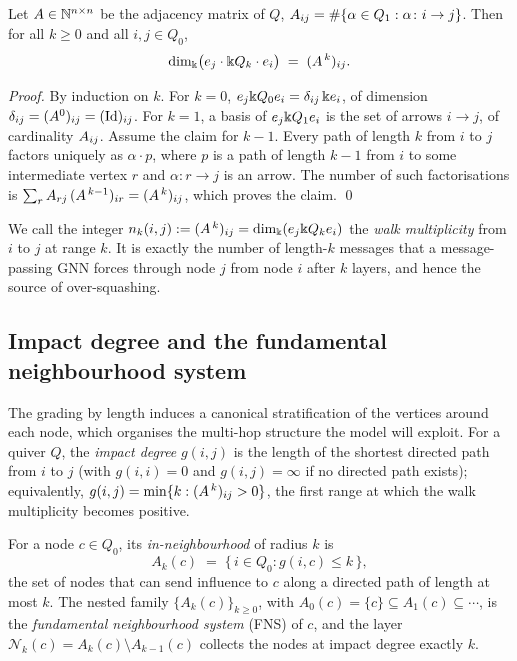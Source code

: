 \begin{proposition}\label{prop:count}
Let $A\in\mathbb{N}^{n\times n}$ be the adjacency matrix of $Q$, $A_{ij}=\#\{\alpha
\in Q_1: \alpha\colon i\to j\}$. Then for all $k\ge 0$ and all $i,j\in Q_0$,
\[
  \dim_{\Bbbk}\bigl(e_j\cdot \Bbbk Q_k\cdot e_i\bigr)
  \;=\; (A^{\,k})_{ij}.
\]
\end{proposition}

\begin{proof}
By induction on $k$. For $k=0$, $e_j\Bbbk Q_0 e_i=\delta_{ij}\,\Bbbk e_i$, of dimension
$\delta_{ij}=(A^0)_{ij}=(\mathrm{Id})_{ij}$. For $k=1$, a basis of
$e_j\Bbbk Q_1 e_i$ is the set of arrows $i\to j$, of cardinality $A_{ij}$.
Assume the claim for $k-1$. Every path of length $k$ from $i$ to $j$ factors
uniquely as $\alpha\cdot p$, where $p$ is a path of length $k-1$ from $i$ to some
intermediate vertex $r$ and $\alpha\colon r\to j$ is an arrow. The number of such
factorisations is $\sum_{r}A_{rj}\,(A^{\,k-1})_{ir}=(A^{\,k})_{ij}$,
which proves the claim. \qed
\end{proof}

We call the integer $n_k(i,j):=(A^{\,k})_{ij}=\dim_\Bbbk(e_j\Bbbk Q_k e_i)$ the
\emph{walk multiplicity} from $i$ to $j$ at range $k$. It is exactly the number
of length-$k$ messages that a message-passing GNN forces through node $j$ from
node $i$ after $k$ layers, and hence the source of over-squashing.

\subsection{Impact degree and the fundamental neighbourhood system}
\label{sec:sfv}

The grading by length induces a canonical stratification of the vertices around
each node, which organises the multi-hop structure the model will exploit. For a
quiver $Q$, the \emph{impact degree} $g(i,j)$ is the length of the shortest
directed path from $i$ to $j$ (with $g(i,i)=0$ and $g(i,j)=\infty$ if no directed
path exists); equivalently, $g(i,j)=\min\{k: (A^{\,k})_{ij}>0\}$, the first
range at which the walk multiplicity becomes positive.

\begin{definition}\label{def:sfv}
For a node $c\in Q_0$, its \emph{in-neighbourhood} of radius $k$ is
\[
  A_k(c) \;=\; \{\,i\in Q_0 : g(i,c)\le k\,\},
\]
the set of nodes that can send influence to $c$ along a directed path of length
at most $k$. The nested family $\{A_k(c)\}_{k\ge 0}$, with
$A_0(c)=\{c\}\subseteq A_1(c)\subseteq\cdots$, is the \emph{fundamental
neighbourhood system} (FNS) of $c$, and the layer
$\mathcal{N}_k(c)=A_k(c)\setminus A_{k-1}(c)$ collects the nodes at impact degree
exactly $k$.
\end{definition}

